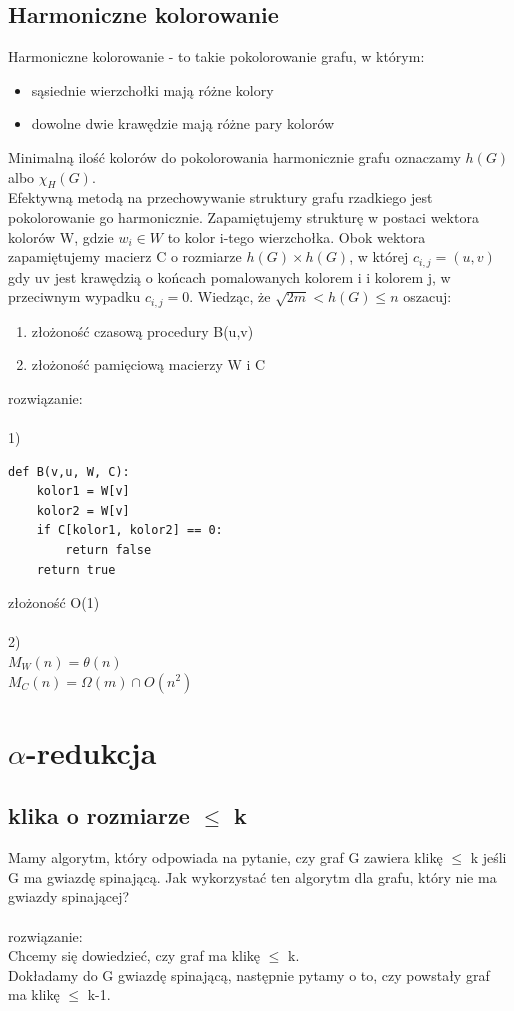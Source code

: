 \documentclass{article}
\begin{document}
\subsection*{Harmoniczne kolorowanie}
Harmoniczne kolorowanie - to takie pokolorowanie grafu,  w którym:
\begin{itemize}
	\item sąsiednie wierzchołki mają różne kolory
	\item dowolne dwie krawędzie mają różne pary kolorów
\end{itemize}
Minimalną ilość kolorów do pokolorowania harmonicznie grafu oznaczamy $h(G)$ albo $\chi_H(G)$.  \\
Efektywną metodą na przechowywanie struktury grafu rzadkiego jest pokolorowanie go harmonicznie. 
Zapamiętujemy strukturę w postaci wektora kolorów W, gdzie $w_i \in W$ to kolor i-tego wierzchołka.
Obok wektora zapamiętujemy macierz C o rozmiarze $h(G) \times h(G)$, w której $c_{i,j} = (u,v)$ gdy uv
jest krawędzią o końcach pomalowanych kolorem i i kolorem j, w przeciwnym wypadku $c_{i,j} = 0$. 
Wiedząc, że $\sqrt{2m} < h(G) \leq n$ oszacuj:
\begin{enumerate}
	\item złożoność czasową procedury B(u,v) 
	\item złożoność pamięciową macierzy W i C
\end{enumerate}
rozwiązanie: \\\\
1)
\begin{lstlisting}
def B(v,u, W, C):
	kolor1 = W[v]
	kolor2 = W[v]
	if C[kolor1, kolor2] == 0:
		return false
	return true	
\end{lstlisting}
złożoność O(1) \\\\
2)\\
$M_W(n) = \theta(n)$ \\
$M_C(n) = \Omega(m) \cap O(n^2)$

\section{$\alpha$-redukcja}
\subsection*{klika o rozmiarze $\leq$ k}
Mamy algorytm, który odpowiada na pytanie, czy graf G zawiera klikę $\leq$ k jeśli G ma gwiazdę spinającą.
Jak wykorzystać ten algorytm dla grafu, który nie ma gwiazdy spinającej? \\\\rozwiązanie:\\
Chcemy się dowiedzieć, czy graf ma klikę $\leq$ k. \\
Dokładamy do G gwiazdę spinającą, następnie pytamy o to, czy powstały graf ma klikę $\leq$ k-1.
\end{document}
